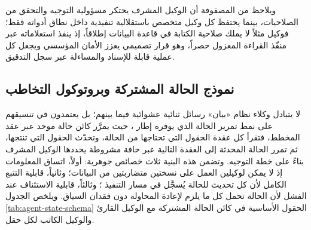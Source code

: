 ويلاحظ من المصفوفة أن الوكيل المشرف يحتكر مسؤولية التوجيه والتحقق من الصلاحيات، بينما يحتفظ كل وكيل متخصص باستقلالية تنفيذية داخل نطاق أدواته فقط؛ فوكيل  مثلاً لا يملك صلاحية الكتابة في قاعدة البيانات إطلاقاً، إذ ينفذ استعلاماته عبر منفّذ القراءة المعزول حصراً، وهو قرار تصميمي يعزز الأمان المؤسسي ويجعل كل عملية قابلة للإسناد والمساءلة عبر سجل التدقيق.

\subsection{نموذج الحالة المشتركة وبروتوكول التخاطب}
\label{subsec:agent-state-schema}

لا يتبادل وكلاء نظام «بيان» رسائل ثنائية عشوائية فيما بينهم؛ بل يعتمدون في تنسيقهم على نمط تمرير الحالة  الذي يوفره إطار ، حيث يمرَّر كائن حالة موحد  عبر عقد المخطط، فتقرأ كل عقدة الحقول التي تحتاجها من الحالة، وتحدّث الحقول التي تنتجها، ثم تمرر الحالة المحدثة إلى العقدة التالية عبر حافة مشروطة  يحددها الوكيل المشرف بناءً على خطة التوجيه. وتضمن هذه البنية ثلاث خصائص جوهرية: أولاً، اتساق المعلومات إذ لا يمكن لوكيلين العمل على نسختين متضاربتين من البيانات؛ وثانياً، قابلية التتبع الكامل لأن كل تحديث للحالة يُسجَّل في مسار التنفيذ ؛ وثالثاً، قابلية الاستئناف عند الفشل لأن الحالة تحمل كل ما يلزم لإعادة المحاولة دون فقدان السياق. ويلخص الجدول \ref{tab:agent-state-schema} الحقول الأساسية في كائن الحالة المشتركة مع الوكيل القارئ والوكيل الكاتب لكل حقل.

